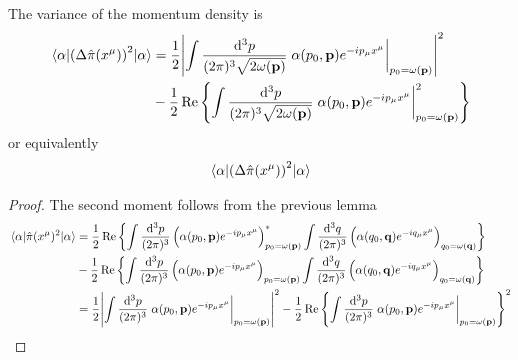 \begin{lemma}\label{thm:qkg_coherent_momentum_density_var}
	The variance of the momentum density is
	\begin{equation}
		\begin{split}
			\expval{\left(\Delta\hat\pi(x^\mu)\right)^2}{\alpha}
			&=
			\frac{1}{2}
			\abs{
				\int\frac{\dd[3]{p}}{(2\pi)^3\sqrt{2\omega(\vb{p})}}
				\eval{
					\alpha(p_0,\vb{p})
					e^{-ip_\mu x^\mu}
				}_{p_0=\omega(\vb{p})}
			}^2
			\\
			&-
			\frac{1}{2}
			\Re\left\{
				\int\frac{\dd[3]{p}}{(2\pi)^3\sqrt{2\omega(\vb{p})}}
				\eval{
					\alpha(p_0,\vb{p})
					e^{-ip_\mu x^\mu}
				}_{p_0=\omega(\vb{p})}^2
			\right\}
		\end{split}
	\end{equation}
	or equivalently
	\begin{equation*}
		\begin{split}
			\expval{\left(\Delta\hat\pi(x^\mu)\right)^2}{\alpha}
		\end{split}
	\end{equation*}
\end{lemma}
\begin{proof}
	The second moment follows from the previous lemma
	\begin{equation*}
		\begin{split}
			\expval{\hat\pi(x^\mu)^2}{\alpha}
			&=
			\frac{1}{2}
			\Re\left\{
				\int\frac{\dd[3]{p}}{(2\pi)^3}
				\left(
					\alpha(p_0,\vb{p})
					e^{-ip_\mu x^\mu}
				\right)^*_{p_0=\omega(\vb{p})}
				\int\frac{\dd[3]{q}}{(2\pi)^3}
				\left(
					\alpha(q_0,\vb{q})
					e^{-iq_\mu x^\mu}
				\right)_{q_0=\omega(\vb{q})}			
			\right\}
			\\
			&-
			\frac{1}{2}
			\Re\left\{
				\int\frac{\dd[3]{p}}{(2\pi)^3}
				\left(
					\alpha(p_0,\vb{p})
					e^{-ip_\mu x^\mu}
				\right)_{p_0=\omega(\vb{p})}
				\int\frac{\dd[3]{q}}{(2\pi)^3}
				\left(
					\alpha(q_0,\vb{q})
					e^{-iq_\mu x^\mu}
				\right)_{q_0=\omega(\vb{q})}
			\right\}
			\\
			&=
			\frac{1}{2}
			\abs{
				\int\frac{\dd[3]{p}}{(2\pi)^3}
				\eval{
					\alpha(p_0,\vb{p})
					e^{-ip_\mu x^\mu}
				}_{p_0=\omega(\vb{p})}
			}^2
			-
			\frac{1}{2}
			\Re\left\{
				\int\frac{\dd[3]{p}}{(2\pi)^3}
				\eval{
					\alpha(p_0,\vb{p})
					e^{-ip_\mu x^\mu}
				}_{p_0=\omega(\vb{p})}
			\right\}^2
		\end{split}
	\end{equation*}
\end{proof}

